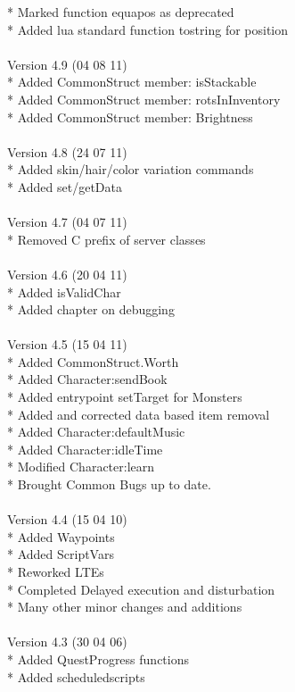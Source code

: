 \documentclass[a4paper,10pt,makeidx]{scrreprt}
\begin{document}
* Marked function equapos as deprecated\\
* Added lua standard function tostring for position\\
\\
Version 4.9 (04 08 11)\\
* Added CommonStruct member: isStackable\\
* Added CommonStruct member: rotsInInventory\\
* Added CommonStruct member: Brightness\\
\\
Version 4.8 (24 07 11)\\
* Added skin/hair/color variation commands\\
* Added set/getData\\
\\
Version 4.7 (04 07 11)\\
* Removed C prefix of server classes\\
\\
Version 4.6 (20 04 11)\\
* Added isValidChar\\
* Added chapter on debugging\\
\\
Version 4.5 (15 04 11)\\
* Added CommonStruct.Worth\\
* Added Character:sendBook\\
* Added entrypoint setTarget for Monsters\\
* Added and corrected data based item removal\\
* Added Character:defaultMusic\\
* Added Character:idleTime\\
* Modified Character:learn\\
* Brought Common Bugs up to date.\\
\\
Version 4.4 (15 04 10)\\
* Added Waypoints\\
* Added ScriptVars\\
* Reworked LTEs\\
* Completed Delayed execution and disturbation\\
* Many other minor changes and additions\\
\\
Version 4.3 (30 04 06)\\
* Added QuestProgress functions\\
* Added scheduledscripts\\
\end{document}
